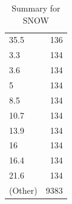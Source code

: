 \begin{table}[ht]
\begin{tabular}{lr}
  35.5 & 136 \\ 
  3.3 & 134 \\ 
  3.6 & 134 \\ 
  5 & 134 \\ 
  8.5 & 134 \\ 
  10.7 & 134 \\ 
  13.9 & 134 \\ 
  16 & 134 \\ 
  16.4 & 134 \\ 
  21.6 & 134 \\ 
  (Other) & 9383 \\ 
   \hline
\end{tabular}
\caption{Summary for SNOW} 
\label{tab: SNOW}
\end{table}
